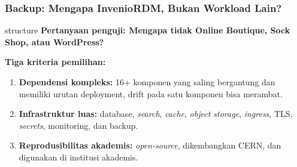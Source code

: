 {
\usebackgroundtemplate{\backgroundcontent}
\begin{frame}
    \frametitle{Backup: Mengapa InvenioRDM, Bukan Workload Lain?}
    \vspace{0.02cm}
    \small
    \begin{beamercolorbox}[wd=\textwidth, sep=0.20cm, center, rounded=true]{structure}
        \small\bfseries Pertanyaan penguji: Mengapa tidak Online Boutique, Sock Shop, atau WordPress?
    \end{beamercolorbox}
    \vspace{0.08cm}
    \textbf{Tiga kriteria pemilihan:}
    \begin{enumerate}
        \item \textbf{Dependensi kompleks:} 16+ komponen yang saling bergantung dan memiliki urutan deployment, drift pada satu komponen bisa merambat.
        \item \textbf{Infrastruktur luas:} database, \textit{search}, \textit{cache}, \textit{object storage}, \textit{ingress}, TLS, \textit{secrets}, monitoring, dan backup.
        \item \textbf{Reprodusibilitas akademis:} \textit{open-source}, dikembangkan CERN, dan digunakan di institusi akademis.
    \end{enumerate}
    \vspace{0.08cm}
\end{frame}
}

